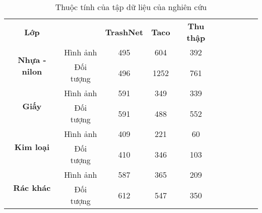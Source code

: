 \documentclass[../the.tex]{subfiles}
\begin{document}
\begin{table}[!ht]
	\centering
	\caption{Thuộc tính của tập dữ liệu của nghiên cứu}
	\begin{tabular}{|c|c|c|c|c|ccccc}
	\cline{1-5}
	\textbf{Lớp}                           &            & \textbf{TrashNet} & \textbf{Taco} & \textbf{Thu thập} \\ \cline{1-5}
	\multirow{2}{*}{\textbf{Nhựa - nilon}} & Hình ảnh   & 495               & 604           & 392                \\ \cline{2-5}
										   & Đối tượng  & 496               & 1252          & 761                 \\ \cline{1-5}
	\multirow{2}{*}{\textbf{Giấy}}         & Hình ảnh   & 591               & 349           & 339                \\ \cline{2-5}
										   & Đối tượng  & 591               & 488           & 552               \\ \cline{1-5}
	\multirow{2}{*}{\textbf{Kim loại}}   & Hình ảnh   & 409               & 221           & 60                  \\ \cline{2-5}
										   & Đối tượng  & 410               & 346           & 103                \\ \cline{1-5}
	\multirow{2}{*}{\textbf{Rác khác}}     & Hình   ảnh & 587               & 365           & 209                 \\ \cline{2-5}
										   & Đối tượng  & 612               & 547           & 350                 \\ \cline{1-5}
	\end{tabular}
	\label{tab:datasetmain}
\end{table}
\end{document}
